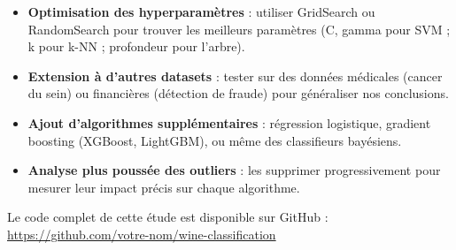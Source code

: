 \documentclass[conference]{IEEEtran}
\begin{document}
\begin{itemize}
    \item \textbf{Optimisation des hyperparamètres} : utiliser GridSearch ou RandomSearch pour trouver les meilleurs paramètres (C, gamma pour SVM ; k pour k-NN ; profondeur pour l'arbre).
    \item \textbf{Extension à d'autres datasets} : tester sur des données médicales (cancer du sein) ou financières (détection de fraude) pour généraliser nos conclusions.
    \item \textbf{Ajout d'algorithmes supplémentaires} : régression logistique, gradient boosting (XGBoost, LightGBM), ou même des classifieurs bayésiens.
    \item \textbf{Analyse plus poussée des outliers} : les supprimer progressivement pour mesurer leur impact précis sur chaque algorithme.
\end{itemize}

Le code complet de cette étude est disponible sur GitHub : \url{https://github.com/votre-nom/wine-classification}




\end{document}
